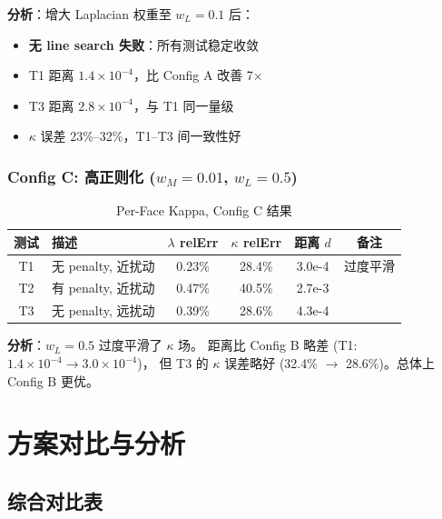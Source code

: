 \documentclass[12pt,a4paper]{article}
\begin{document}
\textbf{分析}：增大 Laplacian 权重至 $w_L = 0.1$ 后：
\begin{itemize}
    \item \textbf{无 line search 失败}：所有测试稳定收敛
    \item T1 距离 $1.4 \times 10^{-4}$，比 Config A 改善 7$\times$
    \item T3 距离 $2.8 \times 10^{-4}$，与 T1 同一量级
    \item $\kappa$ 误差 23\%--32\%，T1--T3 间一致性好
\end{itemize}

\subsubsection{Config C: 高正则化 ($w_M=0.01$, $w_L=0.5$)}

\begin{table}[H]
\centering
\caption{Per-Face Kappa, Config C 结果}
\begin{tabular}{clcccc}
\toprule
测试 & 描述 & $\lambda$ relErr & $\kappa$ relErr & 距离 $d$ & 备注 \\
\midrule
T1 & 无 penalty, 近扰动 & 0.23\% & 28.4\% & 3.0e-4 & 过度平滑 \\
T2 & 有 penalty, 近扰动 & 0.47\% & 40.5\% & 2.7e-3 & \\
T3 & 无 penalty, 远扰动 & 0.39\% & 28.6\% & 4.3e-4 & \\
\bottomrule
\end{tabular}
\end{table}

\textbf{分析}：$w_L = 0.5$ 过度平滑了 $\kappa$ 场。
距离比 Config B 略差 (T1: $1.4 \times 10^{-4} \to 3.0 \times 10^{-4}$)，
但 T3 的 $\kappa$ 误差略好 (32.4\% $\to$ 28.6\%)。总体上 Config B 更优。

\section{方案对比与分析}

\subsection{综合对比表}
\end{document}
